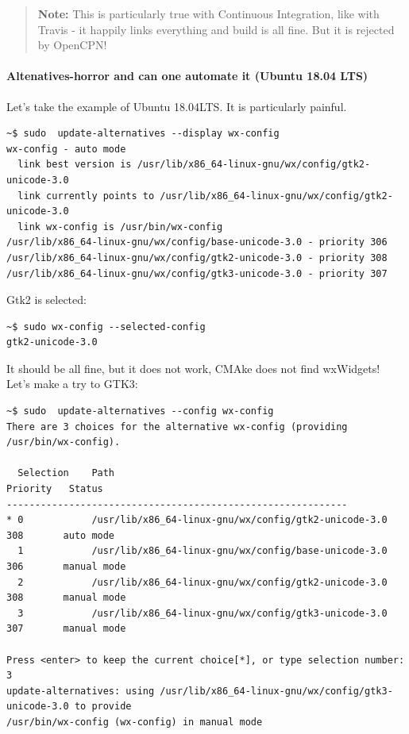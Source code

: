 \documentclass[11pt]{article}
\begin{document}
    \begin{quote}
\textbf{Note:} This is particularly true with Continuous Integration,
like with Travis - it happily links everything and build is all fine.
But it is rejected by OpenCPN!
\end{quote}

    \hypertarget{altenatives-horror-and-can-one-automate-it-ubuntu-18.04-lts}{%
\paragraph{Altenatives-horror and can one automate it (Ubuntu 18.04
LTS)}\label{altenatives-horror-and-can-one-automate-it-ubuntu-18.04-lts}}

    Let's take the example of Ubuntu 18.04LTS. It is particularly painful.

    \begin{verbatim}
~$ sudo  update-alternatives --display wx-config
wx-config - auto mode
  link best version is /usr/lib/x86_64-linux-gnu/wx/config/gtk2-unicode-3.0
  link currently points to /usr/lib/x86_64-linux-gnu/wx/config/gtk2-unicode-3.0
  link wx-config is /usr/bin/wx-config
/usr/lib/x86_64-linux-gnu/wx/config/base-unicode-3.0 - priority 306
/usr/lib/x86_64-linux-gnu/wx/config/gtk2-unicode-3.0 - priority 308
/usr/lib/x86_64-linux-gnu/wx/config/gtk3-unicode-3.0 - priority 307
\end{verbatim}

    Gtk2 is selected:

    \begin{verbatim}
~$ sudo wx-config --selected-config
gtk2-unicode-3.0
\end{verbatim}

    It should be all fine, but it does not work, CMAke does not find
wxWidgets! Let's make a try to GTK3:

    \begin{verbatim}
~$ sudo  update-alternatives --config wx-config
There are 3 choices for the alternative wx-config (providing /usr/bin/wx-config).

  Selection    Path                                                  Priority   Status
------------------------------------------------------------
* 0            /usr/lib/x86_64-linux-gnu/wx/config/gtk2-unicode-3.0   308       auto mode
  1            /usr/lib/x86_64-linux-gnu/wx/config/base-unicode-3.0   306       manual mode
  2            /usr/lib/x86_64-linux-gnu/wx/config/gtk2-unicode-3.0   308       manual mode
  3            /usr/lib/x86_64-linux-gnu/wx/config/gtk3-unicode-3.0   307       manual mode

Press <enter> to keep the current choice[*], or type selection number: 3
update-alternatives: using /usr/lib/x86_64-linux-gnu/wx/config/gtk3-unicode-3.0 to provide
/usr/bin/wx-config (wx-config) in manual mode
\end{verbatim}
\end{document}
